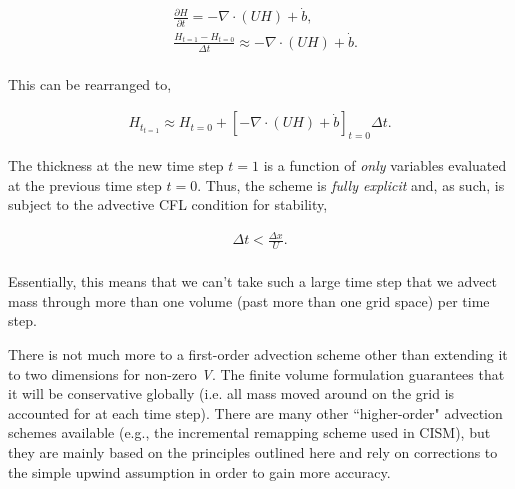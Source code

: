 \begin{align*}
  & \frac{\partial H}{\partial t}=-\nabla \cdot \left( UH \right)+\dot{b}, \\
 & \frac{H_{t=1}-H_{t=0}}{\Delta t}\approx -\nabla \cdot \left( UH \right)+\dot{b}.\\
\end{align*}

This can be rearranged to,

\begin{align*}
H_{t_{t=1}}\approx H_{t=0}+\left[ -\nabla \cdot \left( UH \right)+\dot{b} \right]_{t=0}\Delta t.
\end{align*}

The thickness at the new time step $t=1$ is a function of \textit{only} variables evaluated at the previous time step $t=0$. Thus, the scheme is \textit{fully explicit} and, as such, is subject to the advective CFL condition for stability,

\begin{align*}
\Delta t<\frac{\Delta x}{U}.\\
\end{align*}

Essentially, this means that we can't take such a large time step that we advect mass through more than one volume (past more than one grid space) per time step.

There is not much more to a first-order advection scheme other than extending it to two dimensions for non-zero \textit{V}. The finite volume formulation guarantees that it will be conservative globally (i.e. all mass moved around on the grid is accounted for at each time step). There are many other ``higher-order" advection schemes available (e.g., the incremental remapping scheme used in CISM), but they are mainly based on the principles outlined here and rely on corrections to the simple upwind assumption in order to gain more accuracy.

%